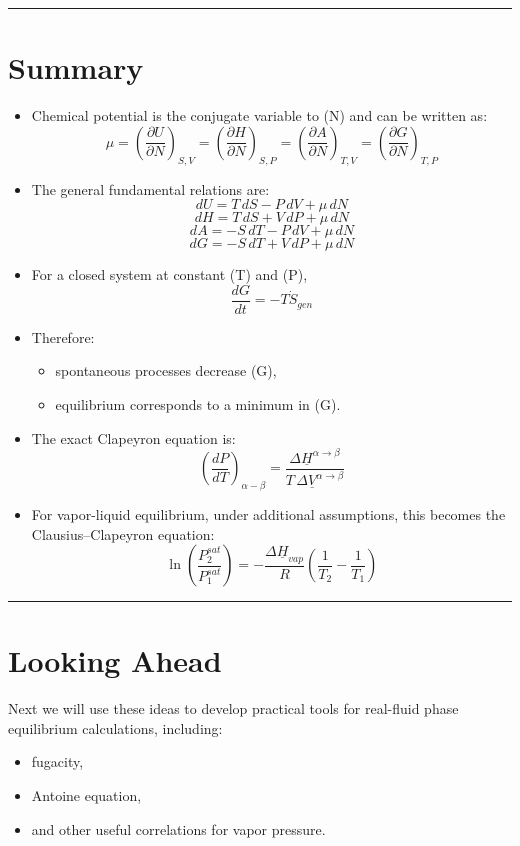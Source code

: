 \documentclass[
  letterpaper,
  DIV=11,
  numbers=noendperiod]{scrartcl}
\providecommand{\tightlist}{%
  \setlength{\itemsep}{0pt}\setlength{\parskip}{0pt}}
\begin{document}
\begin{center}\rule{0.5\linewidth}{0.5pt}\end{center}

\section{Summary}\label{summary}

\begin{itemize}
\item
  Chemical potential is the conjugate variable to (N) and can be written
  as: \[
  \mu =
  \left(\frac{\partial U}{\partial N}\right)_{S,V}
  =
  \left(\frac{\partial H}{\partial N}\right)_{S,P}
  =
  \left(\frac{\partial A}{\partial N}\right)_{T,V}
  =
  \left(\frac{\partial G}{\partial N}\right)_{T,P}
  \]
\item
  The general fundamental relations are: \[
  dU = T\,dS - P\,dV + \mu\,dN
  \] \[
  dH = T\,dS + V\,dP + \mu\,dN
  \] \[
  dA = -S\,dT - P\,dV + \mu\,dN
  \] \[
  dG = -S\,dT + V\,dP + \mu\,dN
  \]
\item
  For a closed system at constant (T) and (P), \[
  \frac{dG}{dt} = -T\dot{S}_{gen}
  \]
\item
  Therefore:

  \begin{itemize}
  \tightlist
  \item
    spontaneous processes decrease (G),
  \item
    equilibrium corresponds to a minimum in (G).
  \end{itemize}
\item
  The exact Clapeyron equation is: \[
  \left(\frac{dP}{dT}\right)_{\alpha-\beta}
  =
  \frac{\Delta \underline{H}^{\alpha\to\beta}}{T\,\Delta \underline{V}^{\alpha\to\beta}}
  \]
\item
  For vapor-liquid equilibrium, under additional assumptions, this
  becomes the Clausius--Clapeyron equation: \[
  \ln\left(\frac{P_2^{sat}}{P_1^{sat}}\right)
  =
  -\frac{\Delta \underline{H}_{vap}}{R}
  \left(\frac{1}{T_2}-\frac{1}{T_1}\right)
  \]
\end{itemize}

\begin{center}\rule{0.5\linewidth}{0.5pt}\end{center}

\section{Looking Ahead}\label{looking-ahead}

Next we will use these ideas to develop practical tools for real-fluid
phase equilibrium calculations, including:

\begin{itemize}
\tightlist
\item
  fugacity,
\item
  Antoine equation,
\item
  and other useful correlations for vapor pressure.
\end{itemize}
\end{document}
